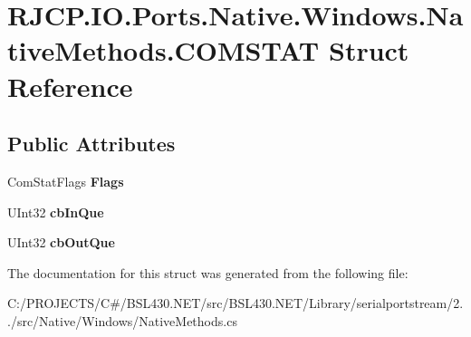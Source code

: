 \hypertarget{struct_r_j_c_p_1_1_i_o_1_1_ports_1_1_native_1_1_windows_1_1_native_methods_1_1_c_o_m_s_t_a_t}{}\section{R\+J\+C\+P.\+I\+O.\+Ports.\+Native.\+Windows.\+Native\+Methods.\+C\+O\+M\+S\+T\+AT Struct Reference}
\label{struct_r_j_c_p_1_1_i_o_1_1_ports_1_1_native_1_1_windows_1_1_native_methods_1_1_c_o_m_s_t_a_t}
\subsection*{Public Attributes}
\begin{DoxyCompactItemize}
\item 
\mbox{\label{struct_r_j_c_p_1_1_i_o_1_1_ports_1_1_native_1_1_windows_1_1_native_methods_1_1_c_o_m_s_t_a_t_a40a3e7ed063854dfa5ac776765f5022a}} 
Com\+Stat\+Flags {\bfseries Flags}
\item 
\mbox{\label{struct_r_j_c_p_1_1_i_o_1_1_ports_1_1_native_1_1_windows_1_1_native_methods_1_1_c_o_m_s_t_a_t_a095cb319eae7fdde5be23cc8cfba369c}} 
U\+Int32 {\bfseries cb\+In\+Que}
\item 
\mbox{\label{struct_r_j_c_p_1_1_i_o_1_1_ports_1_1_native_1_1_windows_1_1_native_methods_1_1_c_o_m_s_t_a_t_a75f30d01280c34d26f6948afcb2f0682}} 
U\+Int32 {\bfseries cb\+Out\+Que}
\end{DoxyCompactItemize}


The documentation for this struct was generated from the following file\+:\begin{DoxyCompactItemize}
\item 
C\+:/\+P\+R\+O\+J\+E\+C\+T\+S/\+C\#/\+B\+S\+L430.\+N\+E\+T/src/\+B\+S\+L430.\+N\+E\+T/\+Library/serialportstream/2../src/\+Native/\+Windows/Native\+Methods.\+cs\end{DoxyCompactItemize}
